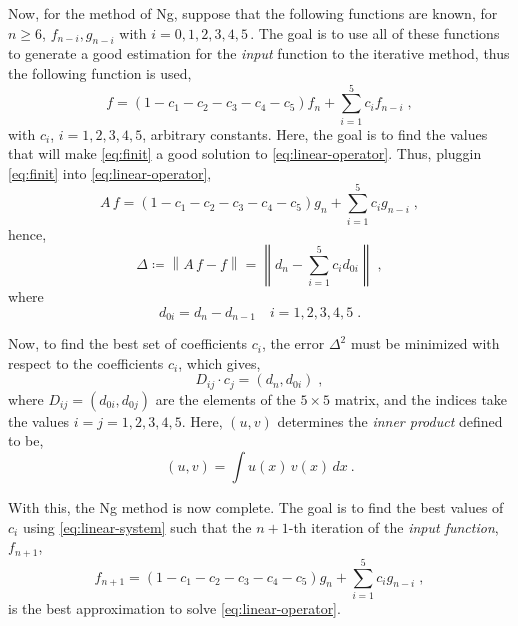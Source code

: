 Now, for the method of Ng, suppose that the following functions are known, for \(n \geq 6\),
\(f_{n-i}, g_{n-i}\) with \(i = 0,1,2,3,4,5 \, .\) The goal is to use all of these 
functions to generate a good estimation for the \emph{input} function to the iterative 
method, thus the following function is used,
\begin{equation}
    f=(1-c_{1}-c_{2}-c_{3}-c_{4}-c_{5}) f_n + \sum_{i=1}^{5} c_i f_{n-i}
    \; ,
    \label{eq:finit}
\end{equation}
with \(c_i\), \(i = 1,2,3,4,5\), arbitrary constants. Here, the goal is to find the values 
that will make \autoref{eq:finit} a good solution to \autoref{eq:linear-operator}.
Thus, pluggin \autoref{eq:finit} into \autoref{eq:linear-operator},
\begin{equation}
    A \, f = (1-c_{1}-c_{2}-c_{3}-c_{4}-c_{5}) g_n + \sum_{i=1}^{5} c_i g_{n-i}
    \; ,
    \label{eq:ginit}
\end{equation}
hence,
\begin{equation}
    \Delta \coloneqq \left\lVert A \, f - f \right\rVert =
    \left\lVert d_n - \sum_{i=1}^{5} c_i d_{0i} \right\rVert
    \; ,
    \label{eq:deltas}
\end{equation}
where
\begin{equation}
    d_{0i} = d_n - d_{n-1} \quad i=1,2,3,4,5
    \; .
    \label{eq:dzeros}
\end{equation}

Now, to find the best set of coefficients \(c_i\), the error \(\Delta^2\) must be minimized 
with respect to the coefficients \(c_i\), which gives,
\begin{equation}
    D_{ij} \cdot c_j = \left(d_n, d_{0i}\right)
    \; ,
    \label{eq:linear-system}
\end{equation}
where \(D_{ij} = \left(d_{0i}, d_{0j}\right)\) are the elements of the \(5 \times 5\) 
matrix, and the indices take the values \(i=j=1,2,3,4,5\). Here, \(\left(u, v\right)\) 
determines the \emph{inner product} defined to be,
\begin{equation}
    \left(u, v\right) = \int u(x) \, v(x) \, dx
    \: .
    \label{eq:inner-product}
\end{equation}

With this, the Ng method is now complete. The goal is to find the best values of \(c_i\) 
using \autoref{eq:linear-system} such that the \(n+1\)-th iteration of the \emph{input 
function}, \(f_{n+1}\),
\begin{equation}
    f_{n+1} = (1-c_{1}-c_{2}-c_{3}-c_{4}-c_{5}) g_n + \sum_{i=1}^{5} c_i g_{n-i}
    \; ,
    \label{eq:best-input}
\end{equation}
is the best approximation to solve \autoref{eq:linear-operator}.